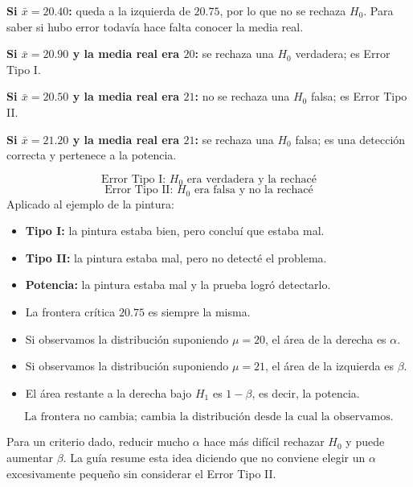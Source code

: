 \documentclass[11pt,a4paper]{article}
\begin{document}
\begin{preguntaoral}
\textbf{Si $\bar{x}=20.40$:} queda a la izquierda de $20.75$, por lo que no se rechaza $H_0$. Para saber si hubo error todavía hace falta conocer la media real.\par
\textbf{Si $\bar{x}=20.90$ y la media real era $20$:} se rechaza una $H_0$ verdadera; es Error Tipo I.\par
\textbf{Si $\bar{x}=20.50$ y la media real era $21$:} no se rechaza una $H_0$ falsa; es Error Tipo II.\par
\textbf{Si $\bar{x}=21.20$ y la media real era $21$:} se rechaza una $H_0$ falsa; es una detección correcta y pertenece a la potencia.
\end{preguntaoral}

\begin{ideaclave}
\[
\boxed{\text{Error Tipo I: }H_0\text{ era verdadera y la rechacé}}
\]
\[
\boxed{\text{Error Tipo II: }H_0\text{ era falsa y no la rechacé}}
\]
Aplicado al ejemplo de la pintura:
\begin{itemize}
\item \textbf{Tipo I:} la pintura estaba bien, pero concluí que estaba mal.
\item \textbf{Tipo II:} la pintura estaba mal, pero no detecté el problema.
\item \textbf{Potencia:} la pintura estaba mal y la prueba logró detectarlo.
\end{itemize}
\end{ideaclave}

\begin{lecturagrafico}
\begin{itemize}
\item La frontera crítica $20.75$ es siempre la misma.
\item Si observamos la distribución suponiendo $\mu=20$, el área de la derecha es $\alpha$.
\item Si observamos la distribución suponiendo $\mu=21$, el área de la izquierda es $\beta$.
\item El área restante a la derecha bajo $H_1$ es $1-\beta$, es decir, la potencia.
\end{itemize}
\[
\boxed{\text{La frontera no cambia; cambia la distribución desde la cual la observamos.}}
\]
\end{lecturagrafico}

\begin{regla}
Para un criterio dado, reducir mucho $\alpha$ hace más difícil rechazar $H_0$ y puede aumentar $\beta$. La guía resume esta idea diciendo que no conviene elegir un $\alpha$ excesivamente pequeño sin considerar el Error Tipo II.
\end{regla}
\end{document}
